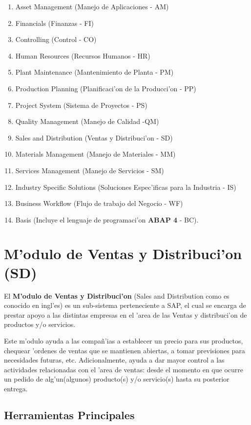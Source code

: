 \begin{enumerate}
\item Asset Management (Manejo de Aplicaciones - AM)
\item Financials (Finanzas - FI)
\item Controlling (Control - CO)
\item Human Resources (Recursos Humanos - HR)
\item Plant Maintenance (Mantenimiento de Planta - PM)
\item Production Planning (Planificaci'on de la Producci'on - PP)
\item Project System (Sistema de Proyectos - PS)
\item Quality Management (Manejo de Calidad -QM)
\item Sales and Distribution (Ventas y Distribuci'on - SD)
\item Materials Management (Manejo de Materiales - MM)
\item Services Management (Manejo de Servicios - SM)
\item Industry Specific Solutions (Soluciones Espec'ificas para la Industria - IS)
\item Business Workflow (Flujo de trabajo del Negocio - WF)
\item Basis (Incluye el lenguaje de programaci'on \textbf{ABAP 4} - BC).

\end{enumerate}

\section{M'odulo de Ventas y Distribuci'on (SD)} \label{sect:sd}

El \textbf{M'odulo de Ventas y Distribuci'on} (Sales and Distribution como es conocido en ingl'es) es un sub-sistema perteneciente a SAP, el cual se encarga de prestar apoyo a las distintas empresas en el 'area de las Ventas y distribuci'on de productos y/o servicios. 

Este m'odulo ayuda a las compa\~n'ias a establecer un precio para sus productos, chequear 'ordenes de ventas que se mantienen abiertas, a tomar previsiones para necesidades futuras, etc. Adicionalmente, ayuda a dar mayor control a las actividades relacionadas con el 'area de ventas: desde el momento en que ocurre un pedido de alg'un(algunos) producto(s) y/o servicio(s) hasta su posterior entrega.

\subsection{Herramientas Principales}
